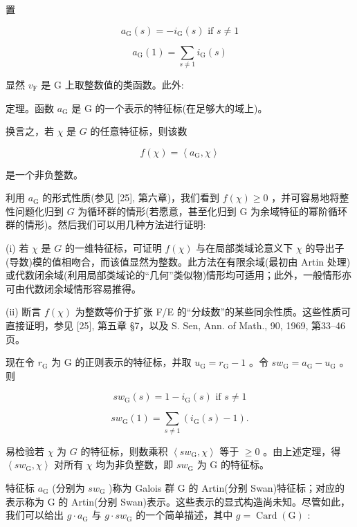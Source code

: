 \documentclass[10pt]{article}
\begin{document}
置

\[
{a}_{\mathrm{G}}\left( s\right)  =  - {i}_{\mathrm{G}}\left( s\right) \text{ if }s \neq  1
\]

\[
{a}_{\mathrm{G}}\left( 1\right)  = \mathop{\sum }\limits_{{s \neq  1}}{i}_{\mathrm{G}}\left( s\right)
\]

显然 \({v}_{\mathrm{F}}\) 是 \(\mathrm{G}\) 上取整数值的类函数。此外:

定理。函数 \({a}_{\mathrm{G}}\) 是 \(\mathrm{G}\) 的一个表示的特征标(在足够大的域上)。

换言之，若 \(\chi\) 是 \(G\) 的任意特征标，则该数

\[
f\left( \chi \right)  = \left\langle  {{a}_{\mathrm{G}},\chi }\right\rangle
\]

是一个非负整数。

利用 \({a}_{\mathrm{G}}\) 的形式性质(参见 [25], 第六章)，我们看到 \(f\left( \chi \right)  \geq  0\) ，并可容易地将整性问题化归到 \(G\) 为循环群的情形(若愿意，甚至化归到 G 为余域特征的幂阶循环群的情形)。然后我们可以用几种方法进行证明:

(i) 若 \(\chi\) 是 \(G\) 的一维特征标，可证明 \(f\left( \chi \right)\) 与在局部类域论意义下 \(\chi\) 的导出子(导数)模的值相吻合，而该值显然为整数。此方法在有限余域(最初由 Artin 处理)或代数闭余域(利用局部类域论的“几何”类似物)情形均可适用；此外，一般情形亦可由代数闭余域情形容易推得。

(ii) 断言 \(f\left( \chi \right)\) 为整数等价于扩张 F/E 的“分歧数”的某些同余性质。这些性质可直接证明，参见 [25], 第五章 §7，以及 S. Sen, Ann. of Math., 90, 1969, 第33–46页。

现在令 \({r}_{\mathrm{G}}\) 为 \(\mathrm{G}\) 的正则表示的特征标，并取 \({u}_{\mathrm{G}} = {r}_{\mathrm{G}} - 1\) 。令 \(s{w}_{\mathrm{G}} = {a}_{\mathrm{G}} - {u}_{\mathrm{G}}\) 。则

\[
s{w}_{\mathrm{G}}\left( s\right)  = 1 - {i}_{\mathrm{G}}\left( s\right) \text{ if }s \neq  1
\]

\[
s{w}_{\mathrm{G}}\left( 1\right)  = \mathop{\sum }\limits_{{s \neq  1}}\left( {{i}_{\mathrm{G}}\left( s\right)  - 1}\right) .
\]

易检验若 \(\chi\) 为 \(G\) 的特征标，则数乘积 \(\left\langle  {s{w}_{\mathrm{G}},\chi }\right\rangle\) 等于 \(\geq  0\) 。由上述定理，得 \(\left\langle  {s{w}_{\mathrm{G}},\chi }\right\rangle\) 对所有 \(\chi\) 均为非负整数，即 \(s{w}_{\mathrm{G}}\) 为 \(\mathrm{G}\) 的特征标。

特征标 \({a}_{\mathrm{G}}\) (分别为 \(s{w}_{\mathrm{G}}\) )称为 Galois 群 G 的 Artin(分别 Swan)特征标；对应的表示称为 G 的 Artin(分别 Swan)表示。这些表示的显式构造尚未知。尽管如此，我们可以给出 \(g \cdot  {a}_{\mathrm{G}}\) 与 \(g \cdot  s{w}_{\mathrm{G}}\) 的一个简单描述，其中 \(g = \operatorname{Card}\left( \mathrm{G}\right)\) :
\end{document}
